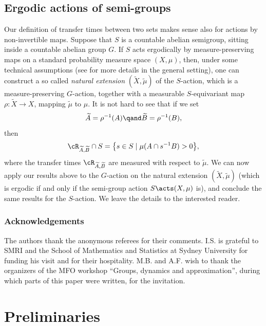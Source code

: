 \subsection{Ergodic actions of semi-groups}

Our definition of transfer times between two sets makes sense also for actions by non-invertible maps. Suppose that $S$ is a countable
abelian semigroup, sitting inside a countable abelian group $G$. If $S$ acts ergodically by measure-preserving maps on a standard
probability measure space $(X,\mu)$, then, under some technical assumptions (see \eg \cite{La} for more details in the general setting), one can construct a
so called \emph{natural extension} $(\widetilde{X},\widetilde{\mu})$ of the $S$-action, which is a measure-preserving $G$-action, together with
a measurable $S$-equivariant map $\rho : \widetilde{X} \to X$, mapping $\widetilde{\mu}$ to $\mu$. It is not hard to see that if we
set
\[
\widetilde{A} = \rho^{-1}(A) \qand \widetilde{B} = \rho^{-1}(B),
\]
then
\[
\cR_{\widetilde{A},\widetilde{B}} \cap S = \bigl\{ s \in S \mid  \mu(A \cap s^{-1}B) > 0 \bigr\},
\]
where the transfer times $\cR_{\widetilde{A},\widetilde{B}}$ are measured with respect to $\tilde{\mu}$. We can now apply our results above
to the $G$-action on the natural extension $(\widetilde{X},\widetilde{\mu})$ (which is ergodic if and only if the semi-group action $S \acts (X,\mu)$ is), and conclude the same results for the
$S$-action. We leave the details to the interested reader.

\subsubsection*{Acknowledgements}
The authors thank the anonymous referees for their comments. I.S. is grateful to SMRI and the School of Mathematics and Statistics at Sydney University for funding his visit and for their hospitality.
M.B. and A.F. wish to thank the organizers of the MFO workshop ``Groups, dynamics and approximation'', during which parts of this paper
were written, for the invitation.

\section{Preliminaries}

